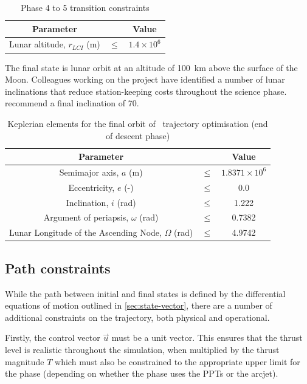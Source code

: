 \begin{table}[h]
\caption{Phase 4 to 5 transition constraints}
\label{tab:Phase-4-5-constraints}
\begin{center}
\begin{tabular} {ccc}\toprule
Parameter && Value\\\midrule
Lunar altitude, $r_{LCI}$ (m) &$\le$& $1.4\times 10^6$\\\bottomrule
\end{tabular}
\end{center}
\end{table}

The final state is lunar orbit at an altitude of 100~km above the surface of the Moon. Colleagues working on the project have identified a number of lunar inclinations that reduce station-keeping costs throughout the science phase. \textcite{Zeile2010} recommend a final inclination of 70\degrees.

\begin{table}[h]
\caption{Keplerian elements for the final orbit of \BW\ trajectory optimisation (end of descent phase)}
\label{tab:Phase-5-constraints}
\begin{center}
\begin{tabular} {ccc}\toprule
Parameter && Value\\\midrule
Semimajor axis, $a$ (m) &$\le$& $1.8371\times 10^6$\\
Eccentricity, $e$ (-) &$\le$& 0.0\\
Inclination, $i$ (rad) &$\le$& 1.222\\
Argument of periapsis, $\omega$ (rad) &$\le$& 0.7382 \\
Lunar Longitude of the Ascending Node, $\Omega$ (rad) &$\le$& 4.9742 \\\bottomrule
\end{tabular}
\end{center}
\end{table}

\subsection{Path constraints} \label{sub:Path-constraints}

While the path between initial and final states is defined by the differential equations of motion outlined in \autoref{sec:state-vector}, there are a number of additional constraints on the trajectory, both physical and operational.

Firstly, the control vector $\vec{u}$ must be a unit vector. This ensures that the thrust level is realistic throughout the simulation, when multiplied by the thrust magnitude $T$ which must also be constrained to the appropriate upper limit for the phase (depending on whether the phase uses the PPTs or the arcjet).

